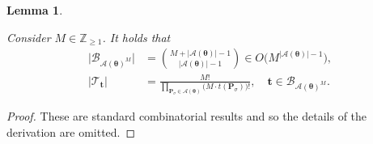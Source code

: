 \documentclass[journal,lettersize,twocolumn]{IEEEtran} %
\newtheorem{lemma}[theorem]{Lemma}
\newcommand{\set}[1]{\mathcal{#1}}
\newcommand{\sZpp}{\mathbb{Z}_{\geq 1}}
\newcommand{\matr}[1]{ \bm{#1} }
\newcommand{\mtheta}{\matr{\theta}}
\newcommand{\mP}{\matr{P}}
\newcommand{\setA}{ \set{A} }
\begin{document}
%

\begin{lemma}
  \label{sec:1:lem:21}

  Consider $ M \in \sZpp $. It holds that
  \begin{align*}
    \bigl| \set{B}_{\setA(\mtheta)^{M}} \bigr|
      &= \binom{M + |\setA(\mtheta)| - 1}{|\setA(\mtheta)| - 1} 
           \in O\bigl( M^{|\setA(\mtheta)|-1} \bigr), \nonumber \\
    |\set{T}_{\bm{t}}| 
      &= \frac{ M! }
              { \prod_{ \mP_{\sigma} \in \setA(\mtheta) } 
                  \bigl( M \cdot t(\mP_{\sigma}) \bigr)! },
           \quad \bm{t} \in \set{B}_{\setA(\mtheta)^{M}}.
  \end{align*}
\end{lemma}

%

\begin{proof}
  These are standard combinatorial results and so the details of the
  derivation are omitted.
\end{proof}

%
\end{document}
